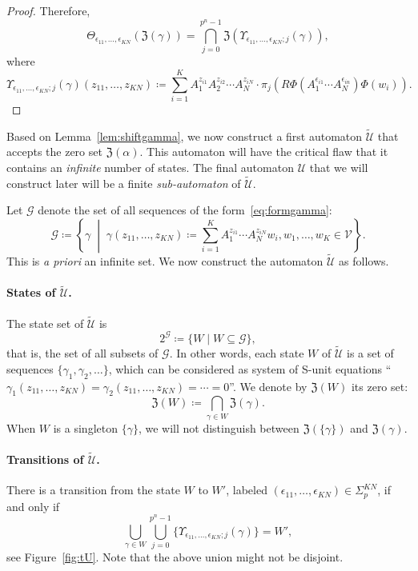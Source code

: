 \documentclass[letterpaper, 11pt, thm-restate]{article}
\numberwithin{equation}{section}
\newcommand{\mG}{\mathcal{G}}
\newcommand{\mV}{\mathcal{V}}
\newcommand{\mZ}{\mathfrak{Z}}
\newcommand{\mmU}{\mathscr{U}}
\newcommand{\tU}{\widetilde{\mathscr{U}}}
\theoremstyle{definition}
\theoremstyle{definition}
\theoremstyle{definition}
\begin{document}
\begin{proof}
    Therefore,
    \[
    \Theta_{\epsilon_{11}, \ldots, \epsilon_{KN}}(\mZ(\gamma)) = \bigcap_{j = 0}^{p^n - 1} \mZ\left(\Upsilon_{\epsilon_{11}, \ldots, \epsilon_{KN}; j}(\gamma)\right),
    \]
    where
    \[
    \Upsilon_{\epsilon_{11}, \ldots, \epsilon_{KN}; j}(\gamma)(z_{11}, \ldots, z_{KN}) \coloneqq \sum_{i=1}^K A_1^{z_{i1}} A_2^{z_{i2}} \cdots A_N^{z_{iN}} \cdot \pi_j\left(R\Phi(A_1^{\epsilon_{i1}} \cdots A_N^{\epsilon_{in}}) \Phi(w_i)\right).
    \]
\end{proof}

Based on Lemma~\ref{lem:shiftgamma}, we now construct a first automaton $\tU$ that accepts the zero set $\mZ(\alpha)$.
This automaton will have the critical flaw that it contains an \emph{infinite} number of states.
The final automaton $\mmU$ that we will construct later will be a finite \emph{sub-automaton} of $\tU$.

Let $\mG$ denote the set of all sequences of the form~\eqref{eq:formgamma}:
    \[
    \mG \coloneqq \left\{\gamma \;\middle|\; \gamma(z_{11}, \ldots, z_{KN}) \coloneqq \sum_{i = 1}^K A_1^{z_{i1}} \cdots A_{N}^{z_{iN}} w_i, w_1, \ldots, w_K \in \mV \right\}.
    \]
This is \emph{a priori} an infinite set.
We now construct the automaton $\tU$ as follows. 

\paragraph*{States of $\tU$.}
The state set of $\tU$ is
\[
    2^{\mG} \coloneqq \{W \mid W \subseteq \mG\},
\]
that is, the set of all subsets of $\mG$.
In other words, each state $W$ of $\tU$ is a set of sequences $\{\gamma_1, \gamma_2, \ldots \}$, which can be considered as system of S-unit equations ``$\gamma_1(z_{11}, \ldots, z_{KN}) = \gamma_2(z_{11}, \ldots, z_{KN}) = \cdots = 0$''.
We denote by $\mZ(W)$ its zero set:
\[
\mZ(W) \coloneqq \bigcap_{\gamma \in W} \mZ(\gamma).
\]
When $W$ is a singleton $\{\gamma\}$, we will not distinguish between $\mZ(\{\gamma\})$ and $\mZ(\gamma)$.

\paragraph*{Transitions of $\tU$.}
There is a transition from the state $W$ to $W'$, labeled $(\epsilon_{11}, \ldots, \epsilon_{KN}) \in \Sigma_p^{KN}$, if and only if
\[
    \bigcup_{\gamma \in W} \bigcup_{j = 0}^{p^n - 1} \big\{\Upsilon_{\epsilon_{11}, \ldots, \epsilon_{KN}; j}(\gamma)\big\} = W',
\]
see Figure~\ref{fig:tU}. Note that the above union might not be disjoint.
\end{document}
